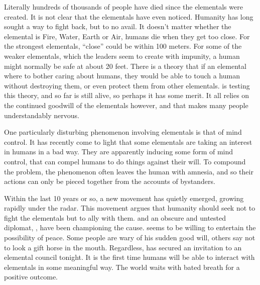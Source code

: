 \documentclass[blue]{elementals}
\begin{document}
Literally hundreds of thousands of people have died since the elementals were created. It is not clear that the elementals have even noticed. Humanity has long sought a way to fight back, but to no avail. It doesn't matter whether the elemental is Fire, Water, Earth or Air, humans die when they get too close. For the strongest elementals, ``close'' could be within 100 meters. For some of the weaker elementals, which the leaders seem to create with impunity, a human might normally be safe at about 20 feet. There is a theory that if an elemental where to bother caring about humans, they would be able to touch a human without destroying them, or even protect them from other elementals. \cDiplomat{} is testing this theory, and so far is still alive, so perhaps it has some merit. It all relies on the continued goodwill of the elementals however, and that makes many people understandably nervous.

One particularly disturbing phenomenon involving elementals is that of mind control. It has recently come to light that some elementals are taking an interest in humans in a bad way. They are apparently inducing some form of mind control, that can compel humans to do things against their will. To compound the problem, the phenomenon often leaves the human with amnesia, and so their actions can only be pieced together from the accounts of bystanders.

Within the last 10 years or so, a new movement has quietly emerged, growing rapidly under the radar. This movement argues that humanity should seek not to fight the elementals but to ally with them. \cLeader{} and an obscure and untested diplomat, \cAvatar{}, have been championing the cause. \cAirKing{} seems to be willing to entertain the possibility of peace. Some people are wary of his sudden good will, others say not to look a gift horse in the mouth. Regardless, \cLeader{} has secured an invitation to an elemental council tonight. It is the first time humans will be able to interact with elementals in some meaningful way. The world waits with bated breath for a positive outcome.

{\bf \cLeader{}}

\end{document}
